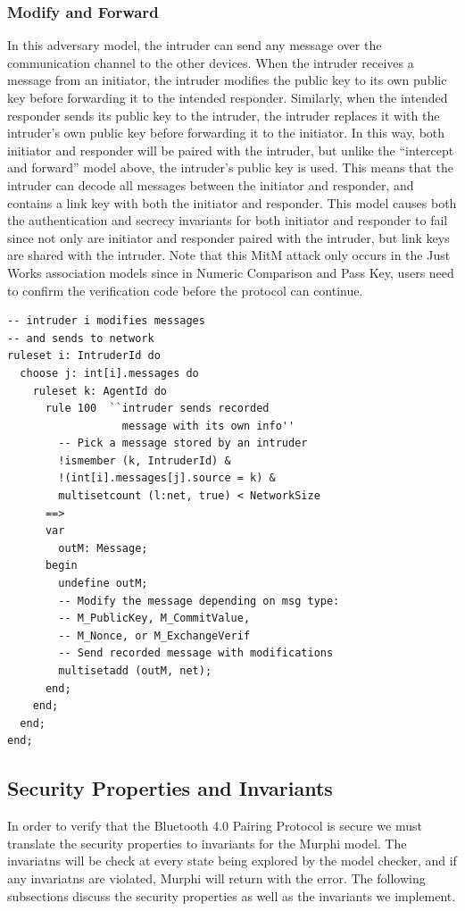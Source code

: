 \documentclass{acm_proc_article-sp}
\begin{document}
\subsubsection{Modify and Forward}
In this adversary model, the intruder can send any message over the communication channel to the other devices. When the intruder receives a message from an initiator, the intruder modifies the public key to its own public key before forwarding it to the intended responder. Similarly, when the intended responder sends its public key to the intruder, the intruder replaces it with the intruder's own public key before forwarding it to the initiator. In this way, both initiator and responder will be paired with the intruder, but unlike the ``intercept and forward'' model above, the intruder's public key is used. This means that the intruder can decode all messages between the initiator and responder, and contains a link key with both the initiator and responder. This model causes both the authentication and secrecy invariants for both initiator and responder to fail since not only are initiator and responder paired with the intruder, but link keys are shared with the intruder. Note that this MitM attack only occurs in the Just Works association models since in Numeric Comparison and Pass Key, users need to confirm the verification code before the protocol can continue.

\begin{verbatim}
-- intruder i modifies messages
-- and sends to network
ruleset i: IntruderId do
  choose j: int[i].messages do
    ruleset k: AgentId do
      rule 100  ``intruder sends recorded
                  message with its own info''
        -- Pick a message stored by an intruder
        !ismember (k, IntruderId) &
        !(int[i].messages[j].source = k) &
        multisetcount (l:net, true) < NetworkSize
      ==>
      var
        outM: Message;
      begin
        undefine outM;
        -- Modify the message depending on msg type:
        -- M_PublicKey, M_CommitValue,
        -- M_Nonce, or M_ExchangeVerif
        -- Send recorded message with modifications
        multisetadd (outM, net);
      end;
    end;
  end;
end;
\end{verbatim}

\subsection{Security Properties and Invariants}
In order to verify that the Bluetooth 4.0 Pairing Protocol is secure we must translate the security properties to invariants for the Murphi model. The invariatns will be check at every state being explored by the model checker, and if any invariatns are violated, Murphi will return with the error. The following subsections discuss the security properties as well as the invariants we implement.
\end{document}
